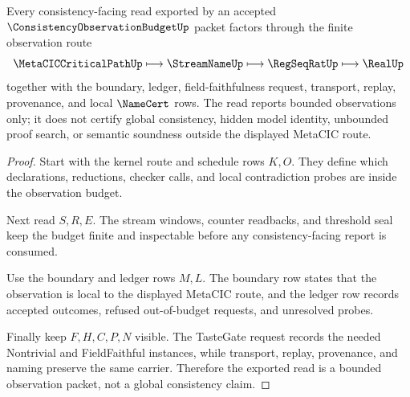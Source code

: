 \begin{theorem}
\label{thm:consistency-observation-finite-budget-boundary}
Every consistency-facing read exported by an accepted $\ConsistencyObservationBudgetUp$ packet factors through the finite observation route
$$
\MetaCICCriticalPathUp \longmapsto \StreamNameUp \longmapsto \RegSeqRatUp \longmapsto \RealUp
$$
together with the boundary, ledger, field-faithfulness request, transport, replay, provenance, and local $\NameCert$ rows. The read reports bounded observations only; it does not certify global consistency, hidden model identity, unbounded proof search, or semantic soundness outside the displayed MetaCIC route.
\end{theorem}
\begin{proof}
Start with the kernel route and schedule rows $K,O$. They define which declarations, reductions, checker calls, and local contradiction probes are inside the observation budget.

Next read $S,R,E$. The stream windows, counter readbacks, and threshold seal keep the budget finite and inspectable before any consistency-facing report is consumed.

Use the boundary and ledger rows $M,L$. The boundary row states that the observation is local to the displayed MetaCIC route, and the ledger row records accepted outcomes, refused out-of-budget requests, and unresolved probes.

Finally keep $F,H,C,P,N$ visible. The TasteGate request records the needed Nontrivial and FieldFaithful instances, while transport, replay, provenance, and naming preserve the same carrier. Therefore the exported read is a bounded observation packet, not a global consistency claim.
\end{proof}



